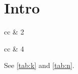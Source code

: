 \documentclass{aastex701}
\begin{document}
\section{Intro}
\begin{deluxetable}{cc}
 & 2 \\
\enddata
\end{deluxetable}
\begin{deluxetable}{cc}
 & 4 \\
\enddata
\end{deluxetable}
See \ref{tab:k} and \ref{tab:n}.
\end{document}
